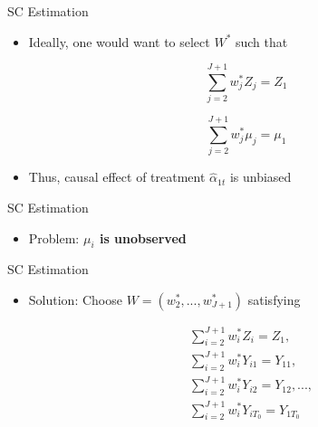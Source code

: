 \documentclass[hyperref={pdfpagelabels=false}]{beamer}
\begin{document}
\begin{frame}{SC Estimation}
\begin{itemize}

\item Ideally, one would want to select $W^{*}$ such that

\begin{equation*}
\sum^{J+1}_{j=2}w^*_{j}Z_{j} = Z_{1}  
\end{equation*}

\begin{equation*}
\sum^{J+1}_{j=2}w^*_{j}\mu_{j} = \mu_{1}  
\end{equation*}

\item Thus, causal effect of treatment $\hat{\alpha}_{1t}$ is unbiased 	

\end{itemize}
\end{frame}







\begin{frame}{SC Estimation}
\begin{itemize}
	
	\item Problem: \textbf{$\mu_{i}$ is unobserved}
\end{itemize}
\end{frame}





\begin{frame}{SC Estimation}
\begin{itemize}

\item Solution: Choose $W=(w^{*}_{2},...,w^{*}_{J+1})$ satisfying

\begin{equation*}
\begin{aligned}
&\sum^{J+1}_{i=2}w^*_{i}Z_{i} = Z_{1}, \\ 
&\sum^{J+1}_{i=2}w^*_{i}Y_{i1} = Y_{11},  \\
&\sum^{J+1}_{i=2}w^*_{i}Y_{i2} = Y_{12},...,  \\
&\sum^{J+1}_{i=2}w^*_{i}Y_{iT_{0}} = Y_{1T_{0}}    
\end{aligned}
\end{equation*}

\end{itemize}
\end{frame}
\end{document}
